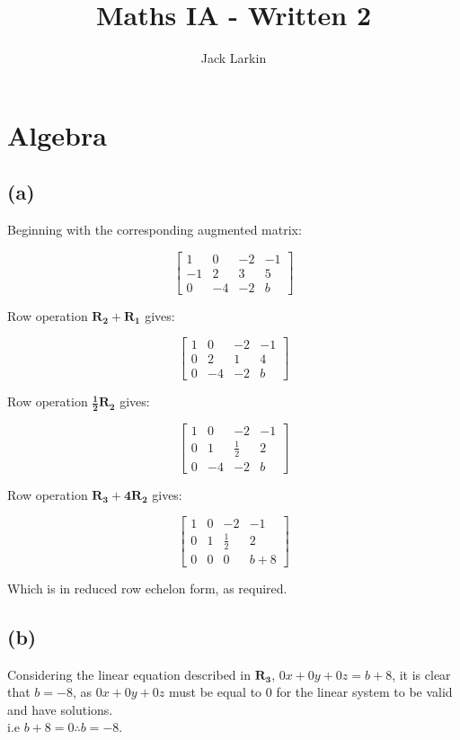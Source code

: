 \documentclass[11pt]{article}
\title{\textbf{Maths IA - Written 2}}
\date{}
\author{Jack Larkin}
\begin{document}
\maketitle

\section*{Algebra}

\subsection*{(a)}

Beginning with the corresponding augmented matrix:

$$\begin{bmatrix}
1 & 0 & -2 & -1\\
-1 & 2 & 3 & 5\\
0 & -4 & -2 & b
\end{bmatrix}$$

Row operation $\mathbf{R_2 + R_1}$ gives:

$$\begin{bmatrix}
1 & 0 & -2 & -1\\
0 & 2 & 1 & 4\\
0 & -4 & -2 & b
\end{bmatrix}$$

Row operation $\mathbf{\frac{1}{2} R_2}$ gives:

$$\begin{bmatrix}
1 & 0 & -2 & -1\\
0 & 1 & \frac{1}{2} & 2\\
0 & -4 & -2 & b
\end{bmatrix}$$

Row operation $\mathbf{R_3 + 4R_2}$ gives:

$$\begin{bmatrix}
1 & 0 & -2 & -1\\
0 & 1 & \frac{1}{2} & 2\\
0 & 0 & 0 & b + 8
\end{bmatrix}$$

Which is in reduced row echelon form, as required.

\subsection*{(b)}
Considering the linear equation described in $\mathbf{R_3}$, $0x + 0y + 0z = b+8$, it is clear that $b=-8$, as $0x +0y +0z$ must be equal to $0$ for the linear system to be valid and have solutions. \\i.e $b+8=0 \therefore b=-8$.
\end{document}
